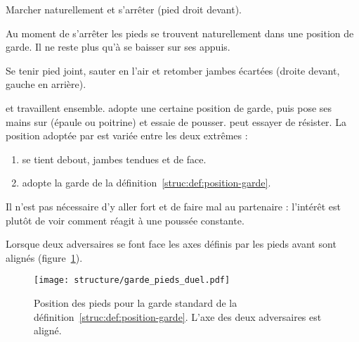 \begin{exercice}

Marcher naturellement et s'arrêter (pied droit devant).

Au moment de s'arrêter les pieds se trouvent naturellement dans une position de garde.
Il ne reste plus qu'à se baisser sur ses appuis.


\end{exercice}


\begin{exercice}

Se tenir pied joint, sauter en l'air et retomber jambes écartées (droite devant, gauche en arrière).


\end{exercice}


\begin{exercice}
\label{struc:ex:test-position}


\A et \D travaillent ensemble.
\D adopte une certaine position de garde, puis \A pose ses mains sur \D (épaule ou poitrine) et essaie de pousser.
\D peut essayer de résister.
La position adoptée par \D est variée entre les deux extrêmes :
\begin{enumerate}
	\item \D se tient debout, jambes tendues et de face.
	\item \D adopte la garde de la définition~\ref{struc:def:position-garde}.
\end{enumerate}

Il n'est pas nécessaire d'y aller fort et de faire mal au partenaire : l'intérêt est plutôt de voir comment \D réagit à une poussée constante.

\end{exercice}


Lorsque deux adversaires se font face les axes définis par les pieds avant sont alignés (figure~\ref{struc:fig:garde-pieds-duel}).

\begin{figure}[ht]
	\centering
	\texttt{[image: structure/garde\_pieds\_duel.pdf]}
	\caption{Position des pieds pour la garde standard de la définition~\ref{struc:def:position-garde}.
	L'axe des deux adversaires est aligné.}
	\label{struc:fig:garde-pieds-duel}
\end{figure}


